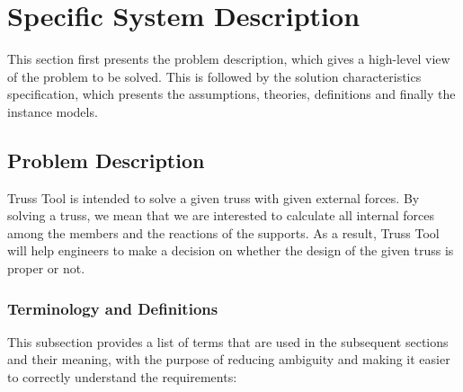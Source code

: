 \documentclass[12pt]{article}
\begin{document}
\section{Specific System Description}

This section first presents the problem description, which gives a high-level view of the problem to be solved.  This is followed by the solution characteristics specification, which presents the assumptions, theories, definitions and finally the instance models.


\subsection{Problem Description} \label{Sec_pd}

Truss Tool is intended to solve a given truss with given external forces. By solving a truss, we mean that we are interested to calculate all internal forces among the members and the reactions of the supports. As a result, Truss Tool will help engineers to make a decision on whether the design of the given truss is proper or not.


\subsubsection{Terminology and  Definitions}


This subsection provides a list of terms that are used in the subsequent
sections and their meaning, with the purpose of reducing ambiguity and making it easier to correctly understand the requirements:
\end{document}
